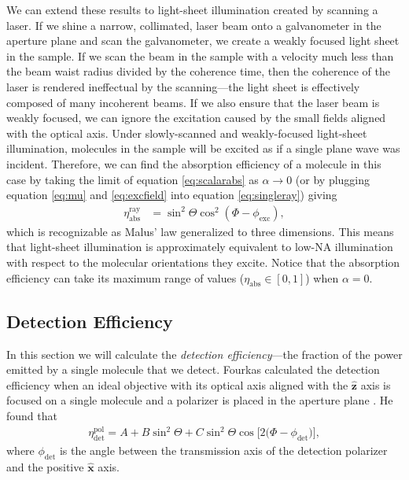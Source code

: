 \documentclass[10pt]{article}
\providecommand{\mh}[1]{\mathbf{\hat{#1}}}
\begin{document}
We can extend these results to light-sheet illumination created by scanning a
laser. If we shine a narrow, collimated, laser beam onto a galvanometer in the
aperture plane and scan the galvanometer, we create a weakly focused light sheet
in the sample. If we scan the beam in the sample with a velocity much less than
the beam waist radius divided by the coherence time, then the coherence of the
laser is rendered ineffectual by the scanning---the light sheet is effectively
composed of many incoherent beams. If we also ensure that the laser beam is
weakly focused, we can ignore the excitation caused by the small fields aligned
with the optical axis. Under slowly-scanned and weakly-focused light-sheet
illumination, molecules in the sample will be excited as if a single plane wave
was incident. Therefore, we can find the absorption efficiency of a molecule in
this case by taking the limit of equation \ref{eq:scalarabs} as
$\alpha \rightarrow 0$ (or by plugging equation \ref{eq:mu} and
\ref{eq:excfield} into equation \ref{eq:singleray}) giving
\begin{align}
  \eta_{\text{abs}}^{\text{ray}} &= \sin^2\Theta\cos^2(\Phi - \phi_{\text{exc}}),
\end{align}
which is recognizable as Malus' law generalized to three dimensions. This means
that light-sheet illumination is approximately equivalent to low-NA illumination
with respect to the molecular orientations they excite. Notice that the
absorption efficiency can take its maximum range of values
($\eta_{\text{abs}} \in [0, 1]$) when $\alpha=0$.

\subsection{Detection Efficiency}\label{detection}
In this section we will calculate the \emph{detection efficiency}---the fraction
of the power emitted by a single molecule that we detect. Fourkas calculated the
detection efficiency when an ideal objective with its optical axis aligned with
the $\mh{z}$ axis is focused on a single molecule and a polarizer is placed in
the aperture plane \cite{fourkas2001}. He found that
\begin{align}
  \eta_{\text{det}}^{\text{pol}} = A + B\sin^2\Theta + C\sin^{2}{\Theta} \cos{[2 (\Phi - \phi_{\text{det}}})], \label{eq:det_pol}
\end{align}
where $\phi_{\text{det}}$ is the angle between the transmission axis of the
detection polarizer and the positive $\mh{x}$ axis. 
\end{document}
